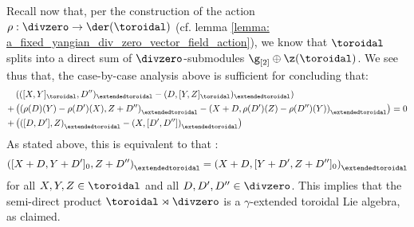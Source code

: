                 Recall now that, per the construction of the action $\rho: \divzero \to \der(\toroidal)$ (cf. lemma \ref{lemma: a_fixed_yangian_div_zero_vector_field_action}), we know that $\toroidal$ splits into a direct sum of $\divzero$-submodules $\g_{[2]} \oplus \z(\toroidal)$. We see thus that, the case-by-case analysis above is sufficient for concluding that:
                    $$
                        \begin{aligned}
                            & \left( ( [X, Y]_{\toroidal}, D'')_{\extendedtoroidal} - (D, [Y, Z]_{\toroidal})_{\extendedtoroidal} \right)
                            \\
                            + & \left( \left(\rho(D)(Y) - \rho(D')(X), Z + D'' \right)_{\extendedtoroidal} - \left( X + D, \rho(D')(Z) - \rho(D'')(Y) \right)_{\extendedtoroidal} \right)
                            \\
                            + & \left( \left( [D, D'], Z \right)_{\extendedtoroidal} - \left(X, [D', D'']\right)_{\extendedtoroidal} \right)
                        \end{aligned}
                        = 0
                    $$
                As stated above, this is equivalent to that :
                    $$\left( [X + D, Y + D']_0, Z + D'' \right)_{\extendedtoroidal} = \left( X + D, [Y + D', Z + D'']_0 \right)_{\extendedtoroidal}$$
                for all $X, Y, Z \in \toroidal$ and all $D, D', D'' \in \divzero$. This implies that the semi-direct product $\toroidal \rtimes \divzero$ is a $\gamma$-extended toroidal Lie algebra, as claimed.